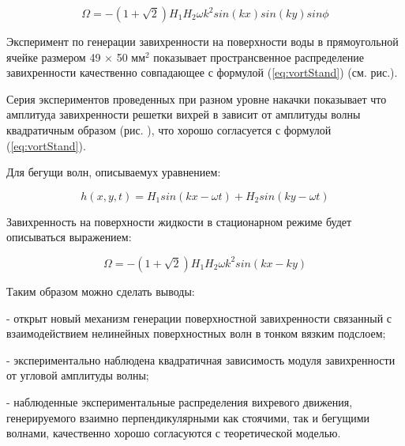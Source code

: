 \begin{equation}
\label{eq:vortStand}
\Omega = -(1 + \sqrt{2}) H_1 H_2 \omega k^2 sin(kx)sin(ky) sin \phi
\end{equation}

Эксперимент по генерации завихренности на поверхности воды в прямоугольной ячейке размером 49 $\times$ 50 мм$^2$ показывает пространсвенное распределение завихренности качественно совпадающее с формулой (\ref{eq:vortStand}) (см. рис.). 

Серия экспериментов проведенных при разном уровне накачки показывает что амплитуда завихренности решетки вихрей в зависит от амплитуды волны квадратичным образом (рис. ), что хорошо согласуется с формулой (\ref{eq:vortStand}).

Для бегущи волн, описываемух уравнением:

\begin{equation}
\label{eq:waveRun}
h(x, y, t) = H_1 sin(kx-\omega t)+H_2 sin(ky-\omega t)
\end{equation}

Завихренность на поверхности жидкости в стационарном режиме будет описываться выражением:

\begin{equation}
 \label{eq:vortRun}
\Omega = -(1 + \sqrt{2})H_1 H_2 \omega k^2 sin(kx-ky)
\end{equation}

Таким образом можно сделать выводы:

 - открыт новый механизм генерации поверхностной завихренности связан­ный с взаимодействием нелинейных поверхностных волн в тонком вязким под­слоем;

 - экспериментально наблюдена квадратичная зависимость модуля завих­ренности от угловой амплитуды волны;
 
 - наблюденные экспериментальные рас­пределения вихревого движения, генерируемого взаимно перпендикулярными как стоячими, так и бегущими волнами, качественно хорошо согласуются с тео­ретической моделью.



